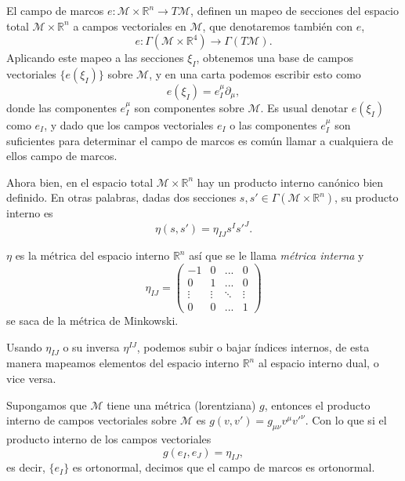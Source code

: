 El campo de marcos \footnotemark $e: \mathcal{M} \times \mathbb{R}^{n} \rightarrow T \mathcal{M}$, definen un mapeo de secciones del espacio total $\mathcal{M} \times \mathbb{R}^{n}$ a campos vectoriales en $\mathcal{M}$, que denotaremos tambi\'{e}n con $e$,
%
\begin{equation}
e: \Gamma(\mathcal{M} \times \mathbb{R}^{4}) \rightarrow \Gamma(T \mathcal{M}).
\end{equation}
%
Aplicando este mapeo a las secciones $\xi_{I}$, obtenemos una base de campos vectoriales $\{e(\xi_{I})\}$ sobre $\mathcal{M}$, y en una carta podemos escribir esto como
%
\begin{equation}
\label{eq:ed}
e(\xi_{I}) = e^{\mu}_{I} \partial_{\mu},
\end{equation}
%
donde las componentes $e^{\mu}_{I}$ son componentes sobre $\mathcal{M}$. Es usual denotar $e(\xi_{I})$ como $e_{I}$, y dado que los campos vectoriales $e_{I}$ o las componentes $e^{\mu}_{I}$ son suficientes para determinar el campo de marcos es com\'{u}n llamar a cualquiera de ellos campo de marcos.

Ahora bien, en el espacio total $\mathcal{M} \times \mathbb{R}^{n}$ hay un producto interno can\'{o}nico bien definido. En otras palabras, dadas dos secciones $s, s' \in \Gamma(\mathcal{M} \times \mathbb{R}^{n})$, su producto interno es
%
\begin{equation}
\eta(s,s') = \eta_{IJ}s^{I}s'^{J}.
\end{equation}

$\eta$ es la m\'{e}trica del espacio interno $\mathbb{R}^{n}$ as\'{i} que se le llama \emph{m\'{e}trica interna} y
%
\[
\eta_{IJ} =
\begin{pmatrix}
-1 & 0 & ... & 0 \\
0 & 1 & ... & 0 \\
\vdots & \vdots & \ddots & \vdots \\
0 & 0 & ... & 1
\end{pmatrix}
\] se saca de la m\'{e}trica de Minkowski.

Usando $\eta_{IJ}$ o su inversa $\eta^{IJ}$, podemos subir o bajar \'{i}ndices internos, de esta manera mapeamos elementos del espacio interno $\mathbb{R}^{n}$ al espacio interno dual, o vice versa.

Supongamos que $\mathcal{M}$ tiene una m\'{e}trica (lorentziana) $g$, entonces el producto interno de campos vectoriales sobre $\mathcal{M}$ es $g(v, v') = g_{\mu \nu} v^{\mu} v'^{\nu}$. Con lo que si el producto interno de los campos vectoriales
%
\begin{equation}
\label{eq:g(ee)}
g(e_{I}, e_{J}) = \eta_{IJ},
\end{equation}
%
es decir, $\{e_{I}\}$ es ortonormal, decimos que el campo de marcos es ortonormal.

